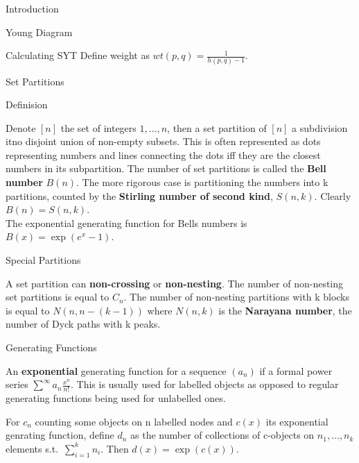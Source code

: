 \documentclass[12pt, letterpaper]{article}
\begin{document}
\begin{section}{Introduction}
\begin{subsection}{Young Diagram}
\begin{subsubsection}{Calculating SYT}
      Define weight as \(wt(p, q) = \frac{1}{h(p, q) - 1}\).

    \end{subsubsection}

  \end{subsection}

  \begin{subsection}{Set Partitions}

    \begin{subsubsection}{Definision}
      
      Denote \([n]\) the set of integers \(1, \dots, n\), then a set partition
      of \([n]\) a subdivision itno disjoint union of non-empty subsets. This is
      often represented as dots representing numbers and lines connecting the
      dots iff they are the closest numbers in its subpartition. The number of
      set partitions is called the \textbf{Bell number} \(B(n)\). The more
      rigorous case is partitioning the numbers into k partitions, counted by
      the \textbf{Stirling number of second kind}, \(S(n, k)\). Clearly
      \(B(n) = S(n ,k)\). \\
      The exponential generating function for Bells numbers is
      \(B(x) = \exp(e^{x} - 1)\).

    \end{subsubsection}

    \begin{subsubsection}{Special Partitions}

      A set partition can \textbf{non-crossing} or \textbf{non-nesting}. The
      number of non-nesting set partitions is equal to \(C_{n}\). The number of
      non-nesting partitions with k blocks is equal to \(N(n, n - (k - 1))\)
      where \(N(n, k)\) is the \textbf{Narayana number}, the number of Dyck
      paths with k peaks.

    \end{subsubsection}

    \begin{subsubsection}{Generating Functions}

      An \textbf{exponential} generating function for a sequence \((a_{n})\) if
      a formal power series \(\sum^{\infty} a_{n} \frac{x^{n}}{n!}\). This is
      usually used for labelled objects as opposed to regular generating
      functions being used for unlabelled ones.

      For \(c_{n}\) counting some objects on n labelled nodes and \(c(x)\) its
      exponential genrating function, define \(d_{n}\) as the number of
      collections of c-objects on \(n_{1}, \dots, n_{k}\) elements s.t.\
      \(\sum^{k}_{i = 1} n_{i}\).  Then \(d(x) = \exp(c(x))\).


\end{subsubsection}
\end{subsection}
\end{section}
\end{document}
